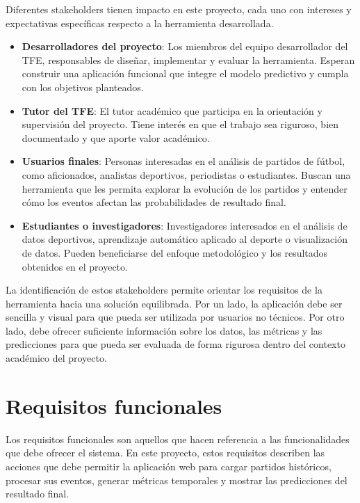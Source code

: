 Diferentes stakeholders tienen impacto en este proyecto, cada uno con intereses y expectativas específicas respecto a la herramienta desarrollada.
\begin{itemize}
    \item \textbf{Desarrolladores del proyecto}: Los miembros del equipo desarrollador del TFE, responsables de diseñar, implementar y evaluar la herramienta. Esperan construir una aplicación funcional que integre el modelo predictivo y cumpla con los objetivos planteados.
    \item \textbf{Tutor del TFE}: El tutor académico que participa en la orientación y supervisión del proyecto. Tiene interés en que el trabajo sea riguroso, bien documentado y que aporte valor académico.
    \item \textbf{Usuarios finales}: Personas interesadas en el análisis de partidos de fútbol, como aficionados, analistas deportivos, periodistas o estudiantes. Buscan una herramienta que les permita explorar la evolución de los partidos y entender cómo los eventos afectan las probabilidades de resultado final.
    \item \textbf{Estudiantes o investigadores}: Investigadores interesados en el análisis de datos deportivos, aprendizaje automático aplicado al deporte o visualización de datos. Pueden beneficiarse del enfoque metodológico y los resultados obtenidos en el proyecto.
\end{itemize}
La identificación de estos stakeholders permite orientar los requisitos de la herramienta hacia una solución equilibrada. Por un lado, la aplicación debe ser sencilla y visual para que pueda ser utilizada por usuarios no técnicos. Por otro lado, debe ofrecer suficiente información sobre los datos, las métricas y las predicciones para que pueda ser evaluada de forma rigurosa dentro del contexto académico del proyecto.


\section{Requisitos funcionales}

Los requisitos funcionales son aquellos que hacen referencia a las funcionalidades que debe ofrecer el sistema. En este proyecto, estos requisitos describen las acciones que debe permitir la aplicación web para cargar partidos históricos, procesar sus eventos, generar métricas temporales y mostrar las predicciones del resultado final.

